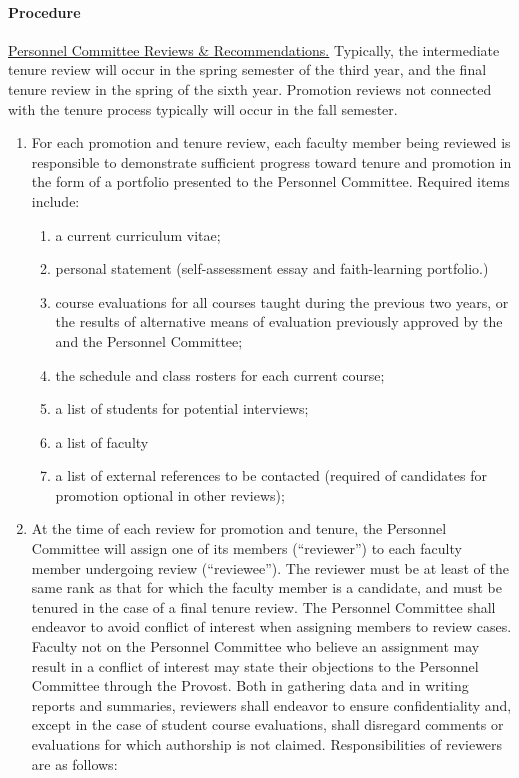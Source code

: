 			\paragraph{Procedure}
				\label{sec:PromotionEvaluationProcedure}
				\underline{Personnel Committee Reviews \& Recommendations.}  Typically, the intermediate tenure review will occur in the spring semester of the third year, and the final tenure review in the spring of the sixth year.  Promotion reviews not connected with the tenure process typically will occur in the fall semester.
				\begin{enumerate}[label=\alph*)]
					\item{For each promotion and tenure review, each faculty member being reviewed is responsible to demonstrate sufficient progress toward tenure and promotion in the form of a portfolio presented to the Personnel Committee.
						Required items include:
						\begin{enumerate}[label=\arabic*)]
							\item{a current curriculum vitae;}
							\item{personal statement (self-assessment essay and faith-learning portfolio.) }
							\item{course evaluations for all courses taught during the previous two years, or the results of alternative means of evaluation previously approved by the and the Personnel Committee;}
							\item{the schedule and class rosters for each current course;}
							\item{a list of students for potential interviews;}
							\item{a list of faculty }
							\item{a list of external references to be contacted (required of candidates for promotion  optional in other reviews);}
						\end{enumerate}
					}
					\item{At the time of each review for promotion and tenure, the Personnel Committee will assign one of its members (``reviewer'') to each faculty member undergoing review (``reviewee'').  The reviewer must be at least of the same rank as that for which the faculty member is a candidate, and must be tenured in the case of a final tenure review.  The Personnel Committee shall endeavor to avoid conflict of interest when assigning members to review cases.  Faculty not on the Personnel Committee who believe an assignment may result in a conflict of interest may state their objections to the Personnel Committee through the Provost.  Both in gathering data and in writing reports and summaries, reviewers shall endeavor to ensure confidentiality and, except in the case of student course evaluations, shall disregard comments or evaluations for which authorship is not claimed.  Responsibilities of reviewers are as follows:
}
\end{enumerate}
